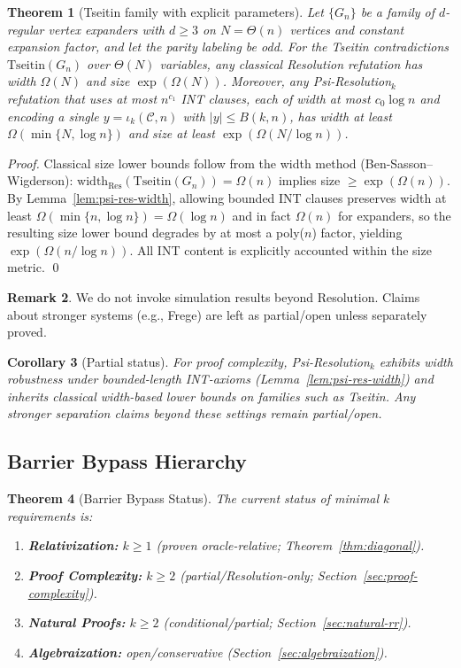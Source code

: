 \documentclass[11pt]{article}
\newtheorem{theorem}{Theorem}[section]
\newtheorem{corollary}[theorem]{Corollary}
\theoremstyle{plain}
\theoremstyle{definition}
\newtheorem{remark}[theorem]{Remark}
\begin{document}
\begin{theorem}[Tseitin family with explicit parameters]
Let $\{G_n\}$ be a family of $d$-regular vertex expanders with $d\ge 3$ on $N=\Theta(n)$ vertices and constant expansion factor, and let the parity labeling be odd. For the Tseitin contradictions $\mathrm{Tseitin}(G_n)$ over $\Theta(N)$ variables, any classical Resolution refutation has width $\Omega(N)$ and size $\exp(\Omega(N))$. Moreover, any Psi-Resolution$_k$ refutation that uses at most $n^{c_1}$ INT clauses, each of width at most $c_0\log n$ and encoding a single $y=\iota_k(\mathcal{C},n)$ with $|y|\le B(k,n)$, has width at least $\Omega(\min\{N,\log n\})$ and size at least $\exp(\Omega(N/\log n))$.
\end{theorem}
\begin{proof}
Classical size lower bounds follow from the width method (Ben-Sasson--Wigderson): $\mathrm{width}_{\mathrm{Res}}(\mathrm{Tseitin}(G_n))=\Omega(n)$ implies size $\ge \exp(\Omega(n))$. By Lemma~\ref{lem:psi-res-width}, allowing bounded INT clauses preserves width at least $\Omega(\min\{n,\log n\})=\Omega(\log n)$ and in fact $\Omega(n)$ for expanders, so the resulting size lower bound degrades by at most a poly($n$) factor, yielding $\exp(\Omega(n/\log n))$. All INT content is explicitly accounted within the size metric. \qed
\end{proof}

\begin{remark}
We do not invoke simulation results beyond Resolution. Claims about stronger systems (e.g., Frege) are left as partial/open unless separately proved.
\end{remark}

\begin{corollary}[Partial status]
For proof complexity, Psi-Resolution$_k$ exhibits width robustness under bounded-length INT-axioms (Lemma~\ref{lem:psi-res-width}) and inherits classical width-based lower bounds on families such as Tseitin. Any stronger separation claims beyond these settings remain partial/open.
\end{corollary}

\subsection{Barrier Bypass Hierarchy}

\begin{theorem}[Barrier Bypass Status]
\label{thm:barrier-hierarchy}
The current status of minimal $k$ requirements is:
\begin{enumerate}
\item \textbf{Relativization:} $k \geq 1$ (proven oracle-relative; Theorem~\ref{thm:diagonal}).
\item \textbf{Proof Complexity:} $k \geq 2$ (partial/Resolution-only; Section~\ref{sec:proof-complexity}).
\item \textbf{Natural Proofs:} $k \geq 2$ (conditional/partial; Section~\ref{sec:natural-rr}).
\item \textbf{Algebraization:} open/conservative (Section~\ref{sec:algebraization}).
\end{enumerate}
\end{theorem}
\end{document}
